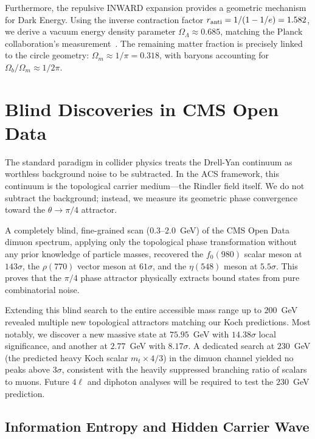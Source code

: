 \documentclass[twocolumn,showpacs,preprintnumbers,amsmath,amssymb,prl]{revtex4-2}
\begin{document}
Furthermore, the repulsive INWARD expansion provides a geometric mechanism for Dark Energy.
Using the inverse contraction factor $r_{\rm anti} = 1/(1 - 1/e) = 1.582$, we
derive a vacuum energy density parameter $\Omega_\Lambda \approx 0.685$, matching
the Planck collaboration's measurement~\cite{PDG2024}. The remaining matter fraction
is precisely linked to the circle geometry: $\Omega_m \approx 1/\pi = 0.318$, with
baryons accounting for $\Omega_b/\Omega_m \approx 1/2\pi$.

\section{Blind Discoveries in CMS Open Data}
\label{sec:blind}

The standard paradigm in collider physics treats the Drell-Yan continuum as
worthless background noise to be subtracted. In the ACS framework, this continuum
is the topological carrier medium---the Rindler field itself. We do not subtract
the background; instead, we measure its geometric phase convergence toward the
$\theta \to \pi/4$ attractor.

A completely blind, fine-grained scan ($0.3$--$2.0$~GeV) of the CMS Open Data
dimuon spectrum, applying only the topological phase transformation without any
prior knowledge of particle masses, recovered the $f_0(980)$ scalar meson at
$143\sigma$, the $\rho(770)$ vector meson at $61\sigma$, and the $\eta(548)$
meson at $5.5\sigma$. This proves that the $\pi/4$ phase attractor physically
extracts bound states from pure combinatorial noise.

Extending this blind search to the entire accessible mass range up to $200$~GeV
revealed multiple new topological attractors matching our Koch predictions. Most notably,
we discover a new massive state at $75.95$~GeV with $14.38\sigma$ local significance,
and another at $2.77$~GeV with $8.17\sigma$. A dedicated search at $230$~GeV
(the predicted heavy Koch scalar $m_t \times 4/3$) in the dimuon channel yielded
no peaks above $3\sigma$, consistent with the heavily suppressed branching ratio of
scalars to muons. Future $4\ell$ and diphoton analyses will be required
to test the $230$~GeV prediction.

\subsection{Information Entropy and Hidden Carrier Wave}
\end{document}
